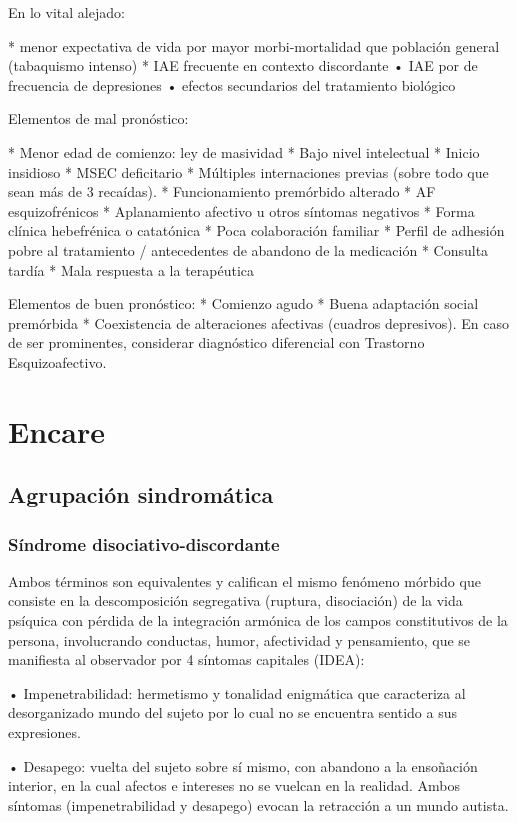 \documentclass{scrbook}
\begin{document}
En lo vital alejado:

* menor expectativa de vida por mayor morbi-mortalidad que población general (tabaquismo intenso)
* IAE frecuente en contexto discordante • IAE por de frecuencia de depresiones • efectos secundarios del tratamiento biológico

Elementos de mal pronóstico:

* Menor edad de comienzo: ley de masividad
* Bajo nivel intelectual
* Inicio insidioso
* MSEC deficitario
* Múltiples internaciones previas (sobre todo que sean más de 3 recaídas).
* Funcionamiento premórbido alterado
* AF esquizofrénicos
* Aplanamiento afectivo u otros síntomas negativos
* Forma clínica hebefrénica o catatónica
* Poca colaboración familiar
* Perfil de adhesión pobre al tratamiento / antecedentes de abandono de la medicación
* Consulta tardía
* Mala respuesta a la terapéutica

Elementos de buen pronóstico:
* Comienzo agudo
* Buena adaptación social premórbida
* Coexistencia de alteraciones afectivas (cuadros depresivos). En caso de ser prominentes, considerar diagnóstico diferencial con Trastorno Esquizoafectivo.

\section*{Encare}
\subsection*{Agrupación sindromática}
\subsubsection*{Síndrome disociativo-discordante}
Ambos términos son equivalentes y califican el mismo fenómeno mórbido que consiste en la descomposición segregativa (ruptura, disociación) de la vida psíquica con pérdida de la integración armónica de los campos constitutivos de la persona, involucrando conductas, humor, afectividad y pensamiento, que se manifiesta al observador por 4 síntomas capitales (IDEA):

• Impenetrabilidad: hermetismo y tonalidad enigmática que caracteriza al desorganizado mundo del sujeto por lo cual no se encuentra sentido a sus expresiones.

• Desapego: vuelta del sujeto sobre sí mismo, con abandono a la ensoñación interior, en la cual afectos e intereses no se vuelcan en la realidad. Ambos síntomas (impenetrabilidad y desapego) evocan la retracción a un mundo autista.
\end{document}
